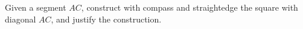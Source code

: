 Given a segment $AC$, construct with compass and straightedge the square with diagonal $AC$, and justify the construction.
